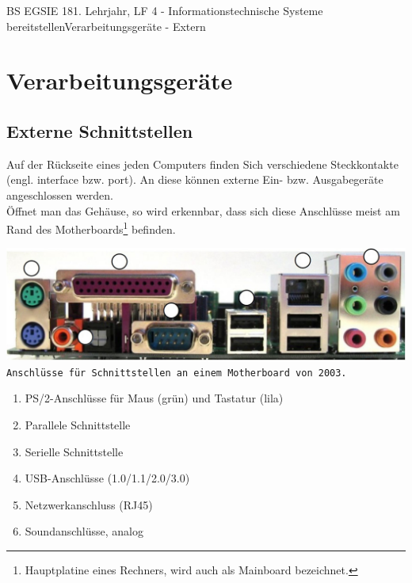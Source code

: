 \documentclass[oneside,openany,headings=optiontotoc,11pt,numbers=noenddot]{article}
\begin{document}
	\begin{worksheet}{BS EGSIE 18}{1. Lehrjahr, LF 4 - Informationstechnische Systeme bereitstellen}{Verarbeitungsgeräte - Extern}
		\onehalfspacing
		\section{Verarbeitungsgeräte}
		\subsection{Externe Schnittstellen}
		Auf der Rückseite eines jeden Computers finden Sich verschiedene Steckkontakte (engl. interface bzw. port). An diese können externe Ein- bzw. Ausgabegeräte angeschlossen werden.\\
		Öffnet man das Gehäuse, so wird erkennbar, dass sich diese Anschlüsse meist am Rand des Motherboards\footnote{Hauptplatine eines Rechners, wird auch als Mainboard bezeichnet.} befinden.\\
		\par\noindent
		\includegraphics[width=\textwidth]{../99_Bilder/MB03.jpg}\\
		\texttt{Anschlüsse für Schnittstellen an einem Motherboard von 2003.}
		\begin{enumerate}
			\item PS/2-Anschlüsse für Maus (grün) und Tastatur (lila)\\
			
			\item Parallele Schnittstelle\\
			
			\item Serielle Schnittstelle\\
			
			\item USB-Anschlüsse (1.0/1.1/2.0/3.0)\\
			
			\item Netzwerkanschluss (RJ45)\\
			
			\item Soundanschlüsse, analog\\
			

\end{enumerate}
\end{worksheet}
\end{document}

